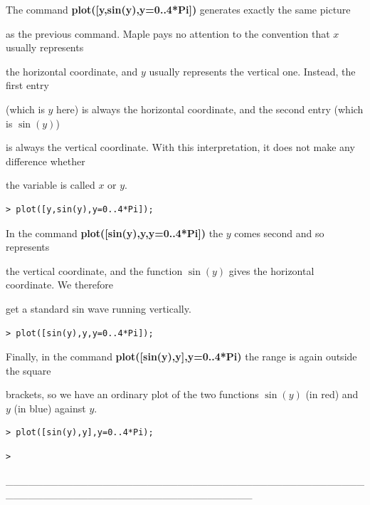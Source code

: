 \documentclass{article}
\begin{document}
\begin{Maple Normal}
The command \textcolor[RGB]{255,0,0}{\textbf{plot([y,sin(y),y=0..4*Pi])}} generates exactly the same picture\

as the previous command.  Maple pays no attention to the convention that 
$ x  $ usually represents\

the horizontal coordinate, and 
$ y  $ usually represents the vertical one.  Instead, the first entry\

(which is 
$ y  $ here) is always the horizontal coordinate, and the second entry (which is 
$ \sin (y) $)\

is always the vertical coordinate.  With this interpretation, it does not make any difference whether\

the variable is called 
$ x  $ or 
$ y  $.\


\end{Maple Normal}
\begin{lstlisting}
> plot([y,sin(y),y=0..4*Pi]);
\end{lstlisting}
\begin{Maple Normal}
In the command \textcolor[RGB]{255,0,0}{\textbf{plot([sin(y),y,y=0..4*Pi])}} the 
$ y  $ comes second and so represents\

the vertical coordinate, and the function 
$ \sin (y) $ gives the horizontal coordinate.  We therefore \

get a standard sin wave running vertically.
\end{Maple Normal}
\begin{lstlisting}
> plot([sin(y),y,y=0..4*Pi]);
\end{lstlisting}
\begin{Maple Normal}
Finally, in the command \textcolor[RGB]{255,0,0}{\textbf{plot([sin(y),y],y=0..4*Pi)}} the range is again outside the square\

brackets, so we have an ordinary plot of the two functions 
$ \sin (y) $ (in red) and 
$ y  $ (in blue) against 
$ y  $.
\end{Maple Normal}
\begin{lstlisting}
> plot([sin(y),y],y=0..4*Pi);
\end{lstlisting}
\begin{lstlisting}
> 
\end{lstlisting}
\begin{Maple Normal}
\_\_\_\_\_\_\_\_\_\_\_\_\_\_\_\_\_\_\_\_\_\_\_\_\_\_\_\_\_\_\_\_\_\_\_\_\_\_\_\_\_\_\_\_\_\_\_\_\_\_\_\_\_\_\_\_\_\_\_\_\_\_\_\_\_\_\_\_\_\_\_\_\_\_\_\_\_\_\_\_\_
\end{Maple Normal}
\end{document}
